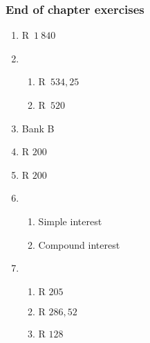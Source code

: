{\begin{multicols}{3}
\subsubsection*{End of chapter exercises} %

    \begin{enumerate}[label=\textbf{\arabic*}.]
	\item R~$1~840$%

	\item %
	\begin{enumerate}[noitemsep, label=\textbf{(\alph*)} ]
	    \item R~$534,25$%
	    \item R~$520$%
	\end{enumerate}

	\item Bank B%

	\item R $200$ %

	\item R $200$ %

	\item %
	\begin{enumerate}[noitemsep, label=\textbf{(\alph*)} ]
	    \item Simple interest%

	    \item Compound interest%
	\end{enumerate}

	\item %
	\begin{enumerate}[noitemsep, label=\textbf{(\alph*)} ]
	\item $\mbox{R }205$
	\item $\mbox{R }286,52$
	\item $\mbox{R }128$
	\end{enumerate}


\end{enumerate}
\end{multicols}}
